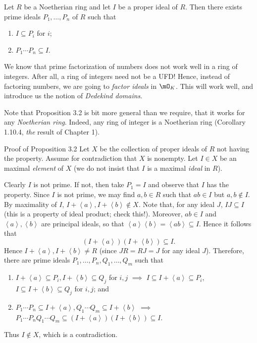 \documentclass[pmath441]{subfiles}
\begin{document}
    \begin{prop}{}
        Let $R$ be a Noetherian ring and let $I$ be a proper ideal of $R$. Then there exists prime ideals $P_1,\ldots,P_n$ of $R$ such that
        \begin{enumerate}
            \item $I\subseteq P_i$ for $i$;
            \item $P_1\cdots P_n \subseteq I$.
        \end{enumerate}
    \end{prop}

    \rruleline

    \np We know that prime factorization of numbers does not work well in a ring of integers. After all, a ring of integers need not be a UFD! Hence, instead of factoring numbers, we are going to \textit{factor ideals} in $\mO_K$. This will work well, and introduce us the notion of \textit{Dedekind domains}. 
    
    Note that Proposition 3.2 is bit more general than we require, that it works for any \textit{Noetherian ring}. Indeed, any ring of integer is a Noetherian ring (Corollary 1.10.4, \textit{the} result of Chapter 1).

    \begin{boxyproof}{Proof of Proposition 3.2}
        Let $X$ be the collection of proper ideals of $R$ not having the property. Assume for contradiction that $X$ is nonempty. Let $I\in X$ be an maximal \textit{element} of $X$ (we do not insist that $I$ is a maximal \textit{ideal} in $R$).

        Clearly $I$ is not prime. If not, then take $P_1=I$ and observe that $I$ has the property. Since $I$ is not prime, we may find $a,b\in R$ such that $ab\in I$ but $a,b\notin I$. By maximality of $I$, $I+\left< a \right>,I+\left< b \right>\notin X$. Note that, for any ideal $J$, $IJ\subseteq I$ (this is a property of ideal product; check this!). Moreover, $ab\in I$ and $\left< a \right>,\left< b \right>$ are principal ideals, so that $\left< a \right>\left< b \right> = \left< ab \right> \subseteq I$. Hence it follows that     
        \begin{equation*}
            \left( I+\left< a \right>  \right)\left( I+\left< b \right>  \right) \subseteq I.
        \end{equation*}
        Hence $I+\left< a \right>, I+\left< b \right>\neq R$ (since $JR=RJ=J$ for any ideal $J$). Therefore, there are prime ideals $P_1,\ldots,P_n,Q_1,\ldots,Q_m$ such that
        \begin{enumerate}
            \item $I+\left< a \right>\subseteq P_i, I+\left< b \right>\subseteq Q_j$ for $i,j$ $\implies$ $I\subseteq I+\left< a \right>\subseteq P_i$, $I\subseteq I+\left< b \right>\subseteq Q_j$ for $i,j$; and
            \item $P_1\cdots P_n\subseteq I+\left< a \right>, Q_1\cdots Q_m\subseteq I+\left< b \right>$ $\implies$ $P_1\cdots P_nQ_1\cdots Q_m\subseteq\left( I+\left< a \right>  \right)\left( I+\left< b \right>  \right)\subseteq I$.
        \end{enumerate}
        Thus $I\notin X$, which is a contradiction.
    \end{boxyproof}
    
\end{document}
